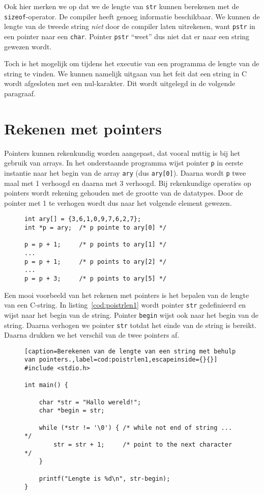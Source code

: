 Ook hier merken we op dat we de lengte van \texttt{str} kunnen berekenen met de \texttt{sizeof}-operator. De compiler heeft genoeg informatie beschikbaar. We kunnen de lengte van de tweede string \textsl{niet} door de compiler laten uitrekenen, want \texttt{pstr} in een pointer naar een \texttt{char}. Pointer \texttt{pstr} ``weet'' dus niet dat er naar een string gewezen wordt.

Toch is het mogelijk om tijdens het executie van een programma de lengte van de string te vinden. We kunnen namelijk uitgaan van het feit dat een string in C wordt afgesloten met een nul-karakter. Dit wordt uitgelegd in de volgende paragraaf.


\section{Rekenen met pointers}
\label{sec:rekenenmetpointers}
Pointers kunnen rekenkundig worden aangepast, dat vooral nuttig is bij het gebruik van arrays.
In het onderstaande programma wijst pointer \texttt{p} in eerste instantie naar het begin van de array \texttt{ary} (dus \texttt{ary[0]}). Daarna wordt \texttt{p} twee maal met 1 verhoogd en daarna met 3 verhoogd. Bij rekenkundige operaties op pointers wordt rekening gehouden met de grootte van de datatypes. Door de pointer met 1 te verhogen wordt dus naar het volgende element gewezen.

\begin{figure}[!ht]
\begin{lstlisting}[caption=Rekenen met pointers.]
int ary[] = {3,6,1,0,9,7,6,2,7};
int *p = ary;  /* p pointe to ary[0] */

p = p + 1;     /* p points to ary[1] */
...
p = p + 1;     /* p points to ary[2] */
...
p = p + 3;     /* p points to ary[5] */

\end{lstlisting}
\end{figure}

Een mooi voorbeeld van het rekenen met pointers is het bepalen van de lengte van een C-string. In listing~\ref{cod:poistrlen1} wordt pointer \texttt{str} gedefinieerd en wijst naar het begin van de string. Pointer \texttt{begin} wijst ook naar het begin van de string. Daarna verhogen we pointer \texttt{str} totdat het einde van de string is bereikt. Daarna drukken we het verschil van de twee pointers af.

\begin{figure}[!ht]
\begin{lstlisting}[caption=Berekenen van de lengte van een string met behulp van pointers.,label=cod:poistrlen1,escapeinside={}{}]
#include <stdio.h>

int main() {

    char *str = "Hallo wereld!";
    char *begin = str;

    while (*str != '\0') { /* while not end of string ... */
        str = str + 1;     /* point to the next character */
    }

    printf("Lengte is %d\n", str-begin);
}
\end{lstlisting}
\end{figure}

